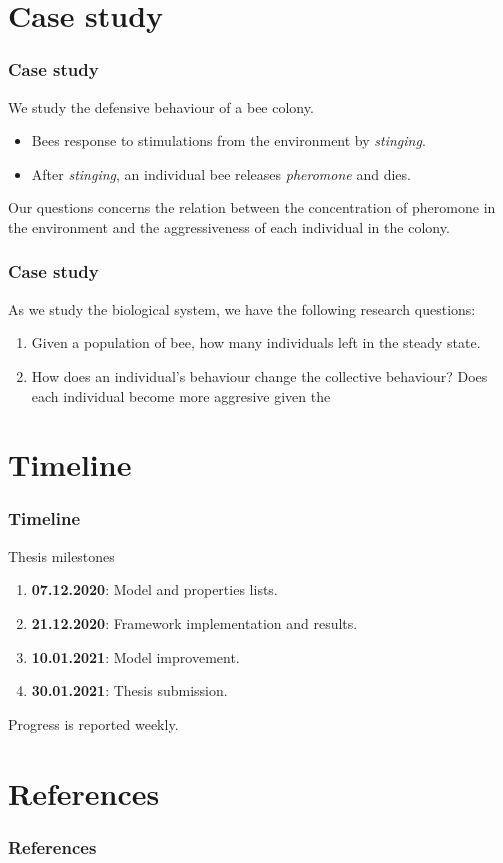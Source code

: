 \documentclass{beamer}
\begin{document}
\section{Case study}
\begin{frame}
  \frametitle{Case study}
  We study the defensive behaviour of a bee colony.
  \begin{itemize}
  \item Bees response to stimulations from the environment by \textit{stinging}.
  \item After \textit{stinging}, an individual bee releases \textit{pheromone}
    and dies.
  \end{itemize}
  Our questions concerns the relation between the concentration of pheromone in
  the environment and the aggressiveness of each individual in the colony.
\end{frame}

\begin{frame}
  \frametitle{Case study}
  As we study the biological system, we have the following research questions:
  \begin{enumerate}
  \item Given a population of bee, how many individuals left in the steady
    state.
  \item How does an individual's behaviour change the collective behaviour? Does
    each individual become more aggresive given the
  \end{enumerate}
\end{frame}

\section{Timeline}
\begin{frame}
  \frametitle{Timeline}
  Thesis milestones
  \begin{enumerate}
  \item \textbf{07.12.2020}: Model and properties lists.
  \item \textbf{21.12.2020}: Framework implementation and results.
  \item \textbf{10.01.2021}: Model improvement.
  \item \textbf{30.01.2021}: Thesis submission.
  \end{enumerate}
  Progress is reported weekly.
\end{frame}

\section{References}
\begin{frame}
  \frametitle{References}
  \printbibliography
  
\end{frame}
\end{document}
